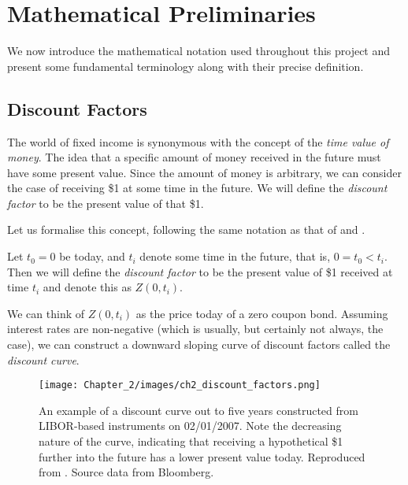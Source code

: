 \section{Mathematical Preliminaries}

We now introduce the mathematical notation used throughout this project and present some fundamental terminology along with their precise definition. 

\subsection{Discount Factors}
The world of fixed income is synonymous with the concept of the \textit{time value of money}. The idea that a specific amount of money received in the future must have some present value. Since the amount of money is arbitrary, we can consider the case of receiving \$1 at some time in the future. We will define the \textit{discount factor} to be the present value of that \$1.

Let us formalise this concept, following the same notation as that of \cite{wilmott2013paul} and \cite{veronesi2016handbook}.

\begin{definition}
\label{disc_fact}
    Let $t_0 = 0$ be today, and $t_i$ denote some time in the future, that is, $0 = t_0 < t_i $. Then we will define the \textit{discount factor} to be the present value of \$1 received at time $t_i$ and denote this as $Z(0, t_i)$.
\end{definition}

We can think of $Z(0,t_i)$ as the price today of a zero coupon bond. Assuming interest rates are non-negative (which is usually, but certainly not always, the case), we can construct a downward sloping curve of discount factors called the \textit{discount curve}.

\vspace{0.75cm}

\begin{figure}[ht]
\begin{center}
\texttt{[image: Chapter\_2/images/ch2\_discount\_factors.png]}
\caption[LIBOR-based Discount Curve on 02/01/2007]{An example of a discount curve out to five years constructed from LIBOR-based instruments on 02/01/2007. Note the decreasing nature of the curve, indicating that receiving a hypothetical \$1 further into the future has a lower present value today. Reproduced from \cite{veronesi2016handbook}. Source data from Bloomberg.}
\label{fig:disc_curve}
\end{center}
\end{figure}

